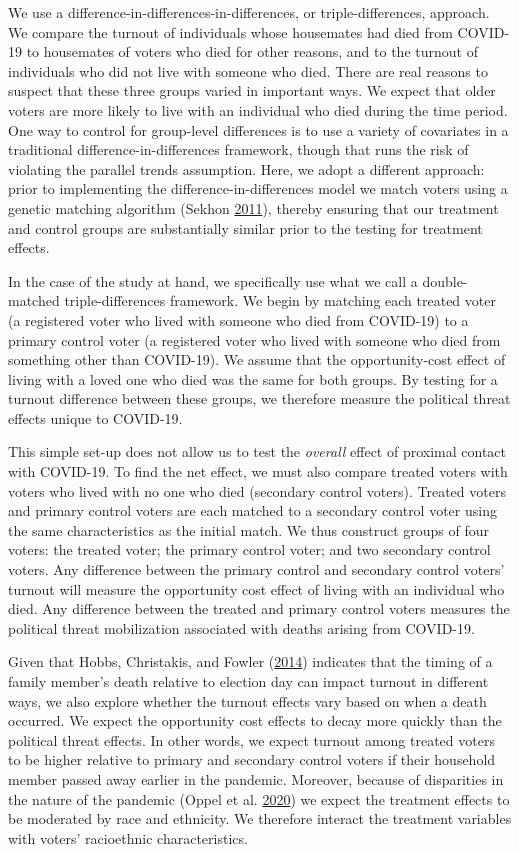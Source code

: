 \documentclass[
  12pt,
]{article}
\begin{document}
We use a difference-in-differences-in-differences, or triple-differences, approach. We compare the turnout of individuals whose housemates had died from COVID-19 to housemates of voters who died for other reasons, and to the turnout of individuals who did not live with someone who died. There are real reasons to suspect that these three groups varied in important ways. We expect that older voters are more likely to live with an individual who died during the time period. One way to control for group-level differences is to use a variety of covariates in a traditional difference-in-differences framework, though that runs the risk of violating the parallel trends assumption. Here, we adopt a different approach: prior to implementing the difference-in-differences model we match voters using a genetic matching algorithm (Sekhon \protect\hyperlink{ref-Sekhon2011}{2011}), thereby ensuring that our treatment and control groups are substantially similar prior to the testing for treatment effects.

In the case of the study at hand, we specifically use what we call a double-matched triple-differences framework. We begin by matching each treated voter (a registered voter who lived with someone who died from COVID-19) to a primary control voter (a registered voter who lived with someone who died from something other than COVID-19). We assume that the opportunity-cost effect of living with a loved one who died was the same for both groups. By testing for a turnout difference between these groups, we therefore measure the political threat effects unique to COVID-19.

This simple set-up does not allow us to test the \emph{overall} effect of proximal contact with COVID-19. To find the net effect, we must also compare treated voters with voters who lived with no one who died (secondary control voters). Treated voters and primary control voters are each matched to a secondary control voter using the same characteristics as the initial match. We thus construct groups of four voters: the treated voter; the primary control voter; and two secondary control voters. Any difference between the primary control and secondary control voters' turnout will measure the opportunity cost effect of living with an individual who died. Any difference between the treated and primary control voters measures the political threat mobilization associated with deaths arising from COVID-19.

Given that Hobbs, Christakis, and Fowler (\protect\hyperlink{ref-Hobbs2014}{2014}) indicates that the timing of a family member's death relative to election day can impact turnout in different ways, we also explore whether the turnout effects vary based on when a death occurred. We expect the opportunity cost effects to decay more quickly than the political threat effects. In other words, we expect turnout among treated voters to be higher relative to primary and secondary control voters if their household member passed away earlier in the pandemic. Moreover, because of disparities in the nature of the pandemic (Oppel et al. \protect\hyperlink{ref-Oppel2020}{2020}) we expect the treatment effects to be moderated by race and ethnicity. We therefore interact the treatment variables with voters' racioethnic characteristics.
\end{document}
